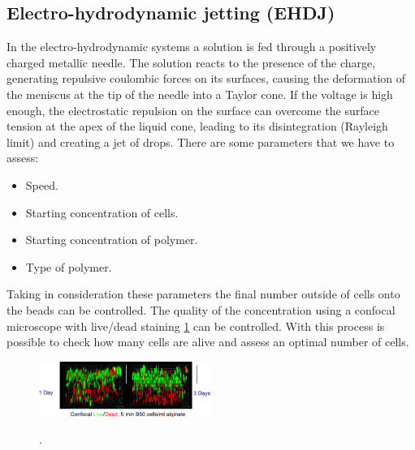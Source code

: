 \subsection{Electro-hydrodynamic jetting (EHDJ)}
In the electro-hydrodynamic systems a solution is fed through a positively charged metallic needle.
The solution reacts to the presence of the charge, generating repulsive coulombic forces on its surfaces, causing the deformation of the meniscus at the tip of the needle into a Taylor cone.
If the voltage is high enough, the electrostatic repulsion on the surface can overcome the surface tension at the apex of the liquid cone, leading to its disintegration (Rayleigh limit) and creating a jet of drops.
There are some parameters that we have to assess:

\begin{multicols}{2}
    \begin{itemize}
        \item Speed.
        \item Starting concentration of cells.
        \item Starting concentration of polymer.
        \item Type of polymer.
    \end{itemize}
\end{multicols}

Taking in consideration these parameters the final number outside of cells onto the beads can be controlled.
The quality of the concentration using a confocal microscope with live/dead staining \ref{fig:staining} can be controlled.
With this process is possible to check how many cells are alive and assess an optimal number of cells.

    \begin{figure}[H]
        \centering
        \includegraphics[width=0.5\textwidth]{staining.png}
        \caption{\label{fig:staining}}.
\end{figure}
